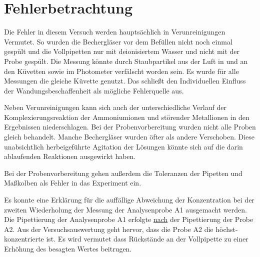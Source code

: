 \section{Fehlerbetrachtung}
\label{sec:fehler}

Die Fehler in diesem Versuch werden hauptsächlich in Verunreinigungen Vermutet. So wurden die Bechergläser vor dem Befüllen nicht noch einmal gespült und die Vollpipetten nur mit deionisiertem Wasser und nicht mit der Probe gespült. Die Messung könnte durch Staubpartikel aus der Luft in und an den Küvetten sowie im Photometer verfälscht worden sein. Es wurde für alle Messungen die gleiche Küvette genutzt. Das schließt den Individuellen Einfluss der Wandungsbeschaffenheit als mögliche Fehlerquelle aus. 

Neben Verunreinigungen kann sich auch der unterschiedliche Verlauf der Komplexierungsreaktion der Ammoniumionen und störender Metallionen in den Ergebnissen niederschlagen. Bei der Probenvorbereitung wurden nicht alle Proben gleich behandelt. Manche Bechergläser wurden öfter als andere Verschoben. Diese unabsichtlich herbeigeführte Agitation der Lösungen könnte sich auf die darin ablaufenden Reaktionen ausgewirkt haben. 

Bei der Probenvorbereitung gehen außerdem die Toleranzen der Pipetten und Maßkolben als Fehler in das Experiment ein. 

Es konnte eine Erklärung für die auffällige Abweichung der Konzentration bei der zweiten Wiederholung der Messung der Analysenprobe A1 ausgemacht werden. Die Pipettierung der Analysenprobe A1 erfolgte \underline{nach} der Pipettierung der Probe A2. Aus der Versuchsauswertung geht hervor, dass die Probe A2 die höchst-konzentrierte ist. Es wird vermutet dass Rückstände an der Vollpipette zu einer Erhöhung des besagten Wertes beitrugen.
\cite{online}